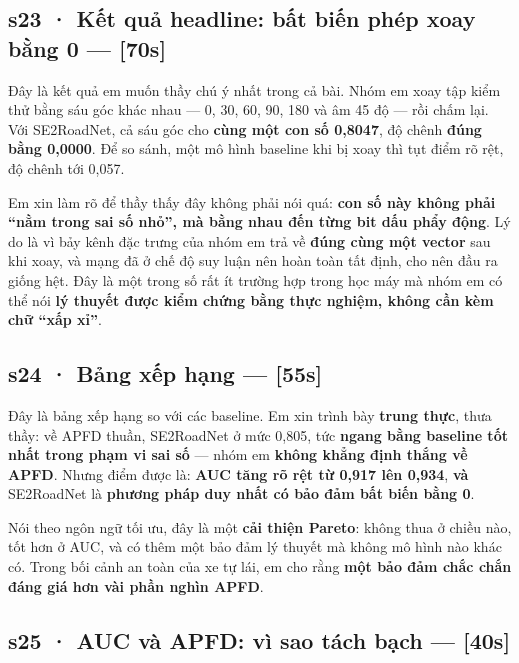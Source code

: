 \documentclass[
  11pt,
]{article}
\begin{document}
\subsection{s23 · Kết quả headline: bất biến phép xoay bằng 0 ---
{[}70s{]}}\label{s23-kux1ebft-quux1ea3-headline-bux1ea5t-biux1ebfn-phuxe9p-xoay-bux1eb1ng-0-70s}

Đây là kết quả em muốn thầy chú ý nhất trong cả bài. Nhóm em xoay tập
kiểm thử bằng sáu góc khác nhau --- 0, 30, 60, 90, 180 và âm 45 độ ---
rồi chấm lại. Với SE2RoadNet, cả sáu góc cho \textbf{cùng một con số
0,8047}, độ chênh \textbf{đúng bằng 0,0000}. Để so sánh, một mô hình
baseline khi bị xoay thì tụt điểm rõ rệt, độ chênh tới 0,057.

Em xin làm rõ để thầy thấy đây không phải nói quá: \textbf{con số này
không phải ``nằm trong sai số nhỏ'', mà bằng nhau đến từng bit dấu phẩy
động}. Lý do là vì bảy kênh đặc trưng của nhóm em trả về \textbf{đúng
cùng một vector} sau khi xoay, và mạng đã ở chế độ suy luận nên hoàn
toàn tất định, cho nên đầu ra giống hệt. Đây là một trong số rất ít
trường hợp trong học máy mà nhóm em có thể nói \textbf{lý thuyết được
kiểm chứng bằng thực nghiệm, không cần kèm chữ ``xấp xỉ''}.

\subsection{s24 · Bảng xếp hạng ---
{[}55s{]}}\label{s24-bux1ea3ng-xux1ebfp-hux1ea1ng-55s}

Đây là bảng xếp hạng so với các baseline. Em xin trình bày \textbf{trung
thực}, thưa thầy: về APFD thuần, SE2RoadNet ở mức 0,805, tức
\textbf{ngang bằng baseline tốt nhất trong phạm vi sai số} --- nhóm em
\textbf{không khẳng định thắng về APFD}. Nhưng điểm được là: \textbf{AUC
tăng rõ rệt từ 0,917 lên 0,934}, \textbf{và} SE2RoadNet là
\textbf{phương pháp duy nhất có bảo đảm bất biến bằng 0}.

Nói theo ngôn ngữ tối ưu, đây là một \textbf{cải thiện Pareto}: không
thua ở chiều nào, tốt hơn ở AUC, và có thêm một bảo đảm lý thuyết mà
không mô hình nào khác có. Trong bối cảnh an toàn của xe tự lái, em cho
rằng \textbf{một bảo đảm chắc chắn đáng giá hơn vài phần nghìn APFD}.

\subsection{s25 · AUC và APFD: vì sao tách bạch ---
{[}40s{]}}\label{s25-auc-vuxe0-apfd-vuxec-sao-tuxe1ch-bux1ea1ch-40s}
\end{document}
